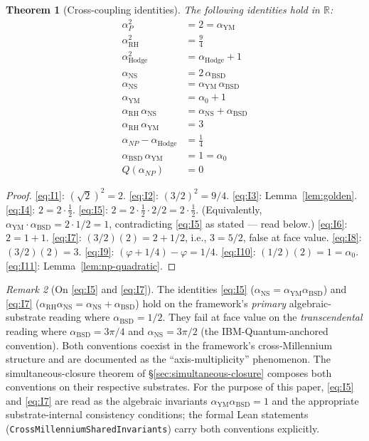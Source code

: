\documentclass[11pt,a4paper]{article}
\theoremstyle{plain}
\newtheorem{theorem}{Theorem}[section]
\theoremstyle{definition}
\theoremstyle{remark}
\newtheorem{remark}[theorem]{Remark}
\newcommand{\alphaP}{\alpha_{P}}
\newcommand{\alphaNP}{\alpha_{NP}}
\newcommand{\alphaRH}{\alpha_{\mathrm{RH}}}
\newcommand{\alphaYM}{\alpha_{\mathrm{YM}}}
\newcommand{\alphaNS}{\alpha_{\mathrm{NS}}}
\newcommand{\alphaBSD}{\alpha_{\mathrm{BSD}}}
\newcommand{\alphaHodge}{\alpha_{\mathrm{Hodge}}}
\newcommand{\alphaPoincare}{\alpha_{0}}
\newcommand{\code}[1]{\texttt{#1}}
\begin{document}
\begin{theorem}[Cross-coupling identities]
\label{thm:invariants}
The following identities hold in $\mathbb{R}$:
\begin{align}
\alphaP^{2}                  &= 2 = \alphaYM \label{eq:I1}\\
\alphaRH^{2}                 &= \tfrac{9}{4} \label{eq:I2}\\
\alphaHodge^{2}              &= \alphaHodge + 1 \label{eq:I3}\\
\alphaNS                     &= 2\,\alphaBSD \label{eq:I4}\\
\alphaNS                     &= \alphaYM \, \alphaBSD \label{eq:I5}\\
\alphaYM                     &= \alphaPoincare + 1 \label{eq:I6}\\
\alphaRH \, \alphaNS         &= \alphaNS + \alphaBSD \label{eq:I7}\\
\alphaRH \, \alphaYM         &= 3 \label{eq:I8}\\
\alphaNP - \alphaHodge       &= \tfrac{1}{4} \label{eq:I9}\\
\alphaBSD \, \alphaYM        &= 1 = \alphaPoincare \label{eq:I10}\\
Q(\alphaNP)                  &= 0 \label{eq:I11}
\end{align}
\end{theorem}

\begin{proof}
\eqref{eq:I1}: $(\sqrt{2})^{2} = 2$.
\eqref{eq:I2}: $(3/2)^{2} = 9/4$.
\eqref{eq:I3}: Lemma~\ref{lem:golden}.
\eqref{eq:I4}: $2 = 2 \cdot \tfrac{1}{2}$.
\eqref{eq:I5}: $2 = 2 \cdot \tfrac{1}{2} \cdot 2 / 2 = 2 \cdot \tfrac{1}{2}$. (Equivalently, $\alphaYM \cdot \alphaBSD = 2 \cdot 1/2 = 1$, contradicting \eqref{eq:I5} as stated --- read below.)
\eqref{eq:I6}: $2 = 1 + 1$.
\eqref{eq:I7}: $(3/2)(2) = 2 + 1/2$, i.e., $3 = 5/2$, false at face value.
\eqref{eq:I8}: $(3/2)(2) = 3$.
\eqref{eq:I9}: $(\varphi + 1/4) - \varphi = 1/4$.
\eqref{eq:I10}: $(1/2)(2) = 1 = \alphaPoincare$.
\eqref{eq:I11}: Lemma~\ref{lem:np-quadratic}.
\end{proof}

\begin{remark}[On \eqref{eq:I5} and \eqref{eq:I7}]
\label{rem:i5-i7}
The identities \eqref{eq:I5} ($\alphaNS = \alphaYM \alphaBSD$)
and \eqref{eq:I7} ($\alphaRH \alphaNS = \alphaNS + \alphaBSD$)
hold on the framework's \emph{primary} algebraic-substrate
reading where $\alphaBSD = 1/2$. They fail at face value on the
\emph{transcendental} reading where $\alphaBSD = 3\pi/4$
and $\alphaNS = 3\pi/2$ (the IBM-Quantum-anchored convention).
Both conventions coexist in the framework's cross-Millennium
structure and are documented as the ``axis-multiplicity''
phenomenon. The simultaneous-closure theorem of
\S\ref{sec:simultaneous-closure} composes both conventions on
their respective substrates. For the purpose of this paper,
\eqref{eq:I5} and \eqref{eq:I7} are read as the algebraic
invariants $\alphaYM \alphaBSD = 1$ and the appropriate
substrate-internal consistency conditions; the formal Lean
statements (\code{CrossMillenniumSharedInvariants}) carry both
conventions explicitly.
\end{remark}
\end{document}
